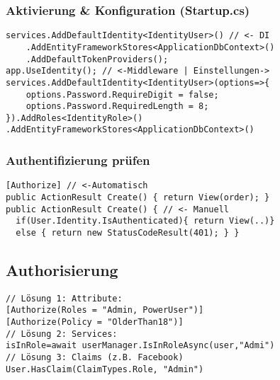 \subsubsection{Aktivierung \& Konfiguration (Startup.cs)}
\begin{lstlisting}[style=CSharp]
services.AddDefaultIdentity<IdentityUser>() // <- DI
    .AddEntityFrameworkStores<ApplicationDbContext>()
    .AddDefaultTokenProviders();
app.UseIdentity(); // <-Middleware | Einstellungen->
services.AddDefaultIdentity<IdentityUser>(options=>{
    options.Password.RequireDigit = false;
    options.Password.RequiredLength = 8;
}).AddRoles<IdentityRole>()
.AddEntityFrameworkStores<ApplicationDbContext>()
\end{lstlisting}


\subsubsection{Authentifizierung prüfen}
\begin{lstlisting}[style=CSharp]
[Authorize] // <-Automatisch
public ActionResult Create() { return View(order); }
public ActionResult Create() { // <- Manuell
  if(User.Identity.IsAuthenticated){ return View(..)}
  else { return new StatusCodeResult(401); } }
\end{lstlisting}

\subsection{Authorisierung}
\begin{lstlisting}[style=CSharp]
// Lösung 1: Attribute:
[Authorize(Roles = "Admin, PowerUser")]
[Authorize(Policy = "OlderThan18")]
// Lösung 2: Services:
isInRole=await userManager.IsInRoleAsync(user,"Admi")
// Lösung 3: Claims (z.B. Facebook)
User.HasClaim(ClaimTypes.Role, "Admin")
\end{lstlisting}

